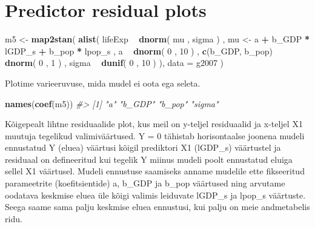 \documentclass[]{book}
\newenvironment{Shaded}{\begin{snugshade}}{\end{snugshade}}
\newcommand{\CommentTok}[1]{\textcolor[rgb]{0.56,0.35,0.01}{\textit{#1}}}
\newcommand{\DataTypeTok}[1]{\textcolor[rgb]{0.13,0.29,0.53}{#1}}
\newcommand{\DecValTok}[1]{\textcolor[rgb]{0.00,0.00,0.81}{#1}}
\newcommand{\KeywordTok}[1]{\textcolor[rgb]{0.13,0.29,0.53}{\textbf{#1}}}
\newcommand{\NormalTok}[1]{#1}
\newcommand{\OperatorTok}[1]{\textcolor[rgb]{0.81,0.36,0.00}{\textbf{#1}}}
\newcommand{\StringTok}[1]{\textcolor[rgb]{0.31,0.60,0.02}{#1}}
\begin{document}
\hypertarget{predictor-residual-plots}{%
\section*{Predictor residual plots}\label{predictor-residual-plots}}

\begin{Shaded}
\begin{Highlighting}[]
\NormalTok{m5 <-}\StringTok{ }\KeywordTok{map2stan}\NormalTok{(}
    \KeywordTok{alist}\NormalTok{(}
\NormalTok{        lifeExp }\OperatorTok{~}\StringTok{ }\KeywordTok{dnorm}\NormalTok{( mu , sigma ) ,}
\NormalTok{        mu <-}\StringTok{ }\NormalTok{a }\OperatorTok{+}\StringTok{ }\NormalTok{b_GDP }\OperatorTok{*}\StringTok{ }\NormalTok{lGDP_s }\OperatorTok{+}\StringTok{ }\NormalTok{b_pop }\OperatorTok{*}\StringTok{ }\NormalTok{lpop_s ,}
\NormalTok{        a }\OperatorTok{~}\StringTok{ }\KeywordTok{dnorm}\NormalTok{( }\DecValTok{0}\NormalTok{ , }\DecValTok{10}\NormalTok{ ) ,}
        \KeywordTok{c}\NormalTok{(b_GDP, b_pop) }\OperatorTok{~}\StringTok{ }\KeywordTok{dnorm}\NormalTok{( }\DecValTok{0}\NormalTok{ , }\DecValTok{1}\NormalTok{ ) ,}
\NormalTok{        sigma }\OperatorTok{~}\StringTok{ }\KeywordTok{dunif}\NormalTok{( }\DecValTok{0}\NormalTok{ , }\DecValTok{10}\NormalTok{ )}
\NormalTok{), }\DataTypeTok{data =}\NormalTok{ g2007 )}
\end{Highlighting}
\end{Shaded}

Plotime varieeruvuse, mida mudel ei oota ega seleta.

\begin{Shaded}
\begin{Highlighting}[]
\KeywordTok{names}\NormalTok{(}\KeywordTok{coef}\NormalTok{(m5))}
\CommentTok{#> [1] "a"     "b_GDP" "b_pop" "sigma"}
\end{Highlighting}
\end{Shaded}

Kõigepealt lihtne residuaalide plot, kus meil on y-teljel residuaalid ja x-teljel X1 muutuja tegelikud valimiväärtused. Y = 0 tähistab horisontaalse joonena mudeli ennustatud Y (eluea) väärtusi kõigil prediktori X1 (lGDP\_s) väärtustel ja residuaal on defineeritud kui tegelik Y miinus mudeli poolt ennustatud eluiga sellel X1 väärtusel. Mudeli ennustuse saamiseks anname mudelile ette fikseeritud parameetrite (koefitsientide) a, b\_GDP ja b\_pop väärtused ning arvutame oodatava keskmise eluea üle kõigi valimis leiduvate lGDP\_s ja lpop\_s väärtuste. Seega saame sama palju keskmise eluea ennustusi, kui palju on meie andmetabelis ridu.
\end{document}
